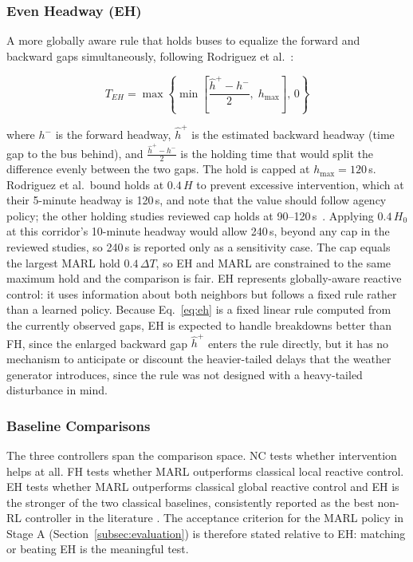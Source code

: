 \subsubsection{Even Headway (EH)}

A more globally aware rule that holds buses to equalize the forward and backward gaps simultaneously, following Rodriguez et al.~\cite{Rodriguez2023Cooperative}:

\begin{equation}
T_{EH} = \max\!\left\{\min\!\left[\frac{\hat{h}^+ - h^-}{2},\; h_{\max}\right],\, 0\right\}
\label{eq:eh}
\end{equation}

where $h^-$ is the forward headway, $\hat{h}^+$ is the estimated backward headway (time gap to the bus behind), and $\frac{\hat{h}^+ - h^-}{2}$ is the holding time that would split the difference evenly between the two gaps. The hold is capped at $h_{\max} = 120$\,s. Rodriguez et al.\ bound holds at $0.4\,H$ to prevent excessive intervention, which at their 5-minute headway is 120\,s, and note that the value should follow agency policy; the other holding studies reviewed cap holds at 90--120\,s~\cite{Wang2023MultiObj,Liu2023DRLHolding,Tang2024Curriculum}. Applying $0.4\,H_0$ at this corridor's 10-minute headway would allow 240\,s, beyond any cap in the reviewed studies, so 240\,s is reported only as a sensitivity case. The cap equals the largest MARL hold $0.4\,\Delta T$, so EH and MARL are constrained to the same maximum hold and the comparison is fair. EH represents globally-aware reactive control: it uses information about both neighbors but follows a fixed rule rather than a learned policy. Because Eq.~\eqref{eq:eh} is a fixed linear rule computed from the currently observed gaps, EH is expected to handle breakdowns better than FH, since the enlarged backward gap $\hat{h}^+$ enters the rule directly, but it has no mechanism to anticipate or discount the heavier-tailed delays that the weather generator introduces, since the rule was not designed with a heavy-tailed disturbance in mind.

\subsubsection{Baseline Comparisons}

The three controllers span the comparison space. NC tests whether intervention helps at all. FH tests whether MARL outperforms classical local reactive control. EH tests whether MARL outperforms classical global reactive control and EH is the stronger of the two classical baselines, consistently reported as the best non-RL controller in the literature \cite{Wangsun,Rodriguez2023Cooperative}. The acceptance criterion for the MARL policy in Stage A (Section~\ref{subsec:evaluation}) is therefore stated relative to EH: matching or beating EH is the meaningful test.

